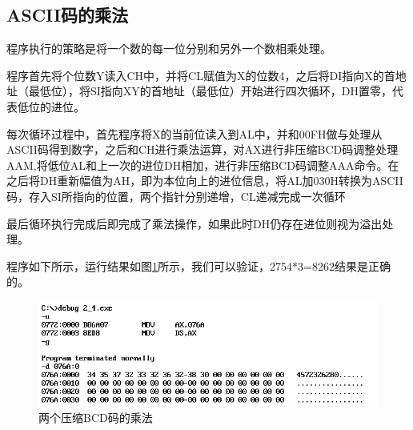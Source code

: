 \documentclass[UTF8,a4paper]{ctexart}
\begin{document}
\subsection{ASCII码的乘法}
程序执行的策略是将一个数的每一位分别和另外一个数相乘处理。

程序首先将个位数Y读入CH中，并将CL赋值为X的位数4，之后将DI指向X的首地址（最低位），将SI指向XY的首地址（最低位）开始进行四次循环，DH置零，代表低位的进位。

每次循环过程中，首先程序将X的当前位读入到AL中，并和00FH做与处理从ASCII码得到数字，之后和CH进行乘法运算，对AX进行非压缩BCD码调整处理AAM,将低位AL和上一次的进位DH相加，进行非压缩BCD码调整AAA命令。在之后将DH重新幅值为AH，即为本位向上的进位信息，将AL加030H转换为ASCII码，存入SI所指向的位置，两个指针分别递增，CL递减完成一次循环

最后循环执行完成后即完成了乘法操作，如果此时DH仍存在进位则视为溢出处理。

程序如下所示，运行结果如图\ref{p221}所示，我们可以验证，2754*3=8262结果是正确的。


\begin{figure}[b]
\centering
\includegraphics[width=\textwidth]{p221.png}
\caption{两个压缩BCD码的乘法}
\label{p221}
\end{figure}
\end{document}

